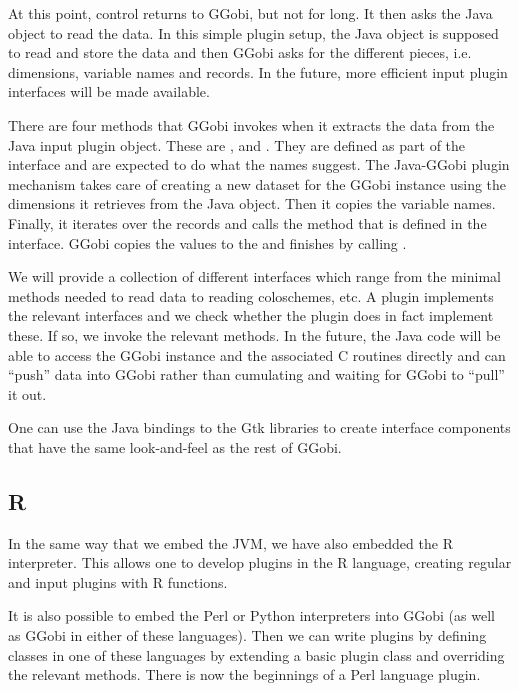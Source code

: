 \documentclass{article}
\begin{document}
At this point, control returns to GGobi, but not for long. It then
asks the Java object to read the data.  In this simple plugin setup,
the Java object is supposed to read and store the data and then GGobi
asks for the different pieces, i.e.  dimensions, variable names and
records. In the future, more efficient input plugin interfaces
will be made available.

There are four methods that GGobi invokes when it extracts the data
from the Java input plugin object. These are ,
 and .  They are
defined as part of the  interface and are
expected to do what the names suggest.  The Java-GGobi plugin
mechanism takes care of creating a new dataset for the GGobi instance
using the dimensions it retrieves from the Java object.  Then it
copies the variable names.  Finally, it iterates over the records and
calls the  method that is defined in the
 interface.  GGobi copies the values to
the  and finishes by calling .

We will provide a collection of different interfaces which range from
the minimal methods needed to read data to reading coloschemes, etc.
A plugin implements the relevant interfaces and we check whether the
plugin does in fact implement these. If so, we invoke the relevant
methods.  In the future, the Java code will be able to access the
GGobi instance and the associated C routines directly and can ``push''
data into GGobi rather than cumulating and waiting for GGobi to
``pull'' it out.

One can use the Java bindings to the Gtk libraries to create interface
components that have the same look-and-feel as the rest of GGobi.

\subsection{R}

In the same way that we embed the JVM, we have also embedded the R
interpreter.  This allows one to develop plugins in the R language,
creating regular and input plugins with R functions.


It is also possible to embed the Perl or Python interpreters into
GGobi (as well as GGobi in either of these languages).  Then we can
write plugins by defining classes in one of these languages by
extending a basic plugin class and overriding the relevant methods.
There is now the beginnings of a Perl language plugin.
\end{document}
